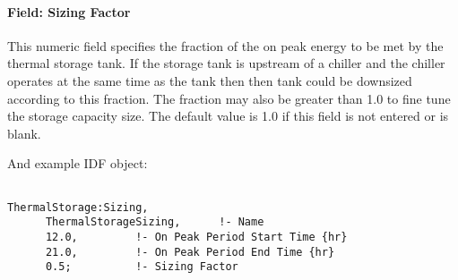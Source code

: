 \paragraph{Field: Sizing Factor}\label{field-sizing-factor-20-105}

This numeric field specifies the fraction of the on peak energy to be met by the thermal storage tank. If the storage tank is upstream of a chiller and the chiller operates at the same time as the tank then then tank could be downsized according to this fraction. The fraction may also be greater than 1.0 to fine tune the storage capacity size. The default value is 1.0 if this field is not entered or is blank.

And example IDF object:

\begin{lstlisting}

ThermalStorage:Sizing,
      ThermalStorageSizing,      !- Name
      12.0,         !- On Peak Period Start Time {hr}
      21.0,         !- On Peak Period End Time {hr}
      0.5;          !- Sizing Factor
\end{lstlisting}


